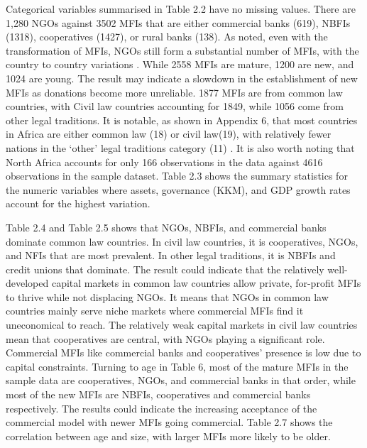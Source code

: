 \documentclass[a4paper, nobind]{templates/ociamthesis}
\begin{document}
Categorical variables summarised in Table 2.2 have no missing values. There are 1,280 NGOs against 3502 MFIs that are either commercial banks (619), NBFIs (1318), cooperatives (1427), or rural banks (138). As noted, even with the transformation of MFIs, NGOs still form a substantial number of MFIs, with the country to country variations \autocite{d2017ngos}. While 2558 MFIs are mature, 1200 are new, and 1024 are young. The result may indicate a slowdown in the establishment of new MFIs as donations become more unreliable. 1877 MFIs are from common law countries, with Civil law countries accounting for 1849, while 1056 come from other legal traditions. It is notable, as shown in Appendix 6, that most countries in Africa are either common law (18) or civil law(19), with relatively fewer nations in the `other' legal traditions category (11) \autocite{oto2014distribution}. It is also worth noting that North Africa accounts for only 166 observations in the data against 4616 observations in the sample dataset. Table 2.3 shows the summary statistics for the numeric variables where assets, governance (KKM), and GDP growth rates account for the highest variation.

Table 2.4 and Table 2.5 shows that NGOs, NBFIs, and commercial banks dominate common law countries. In civil law countries, it is cooperatives, NGOs, and NFIs that are most prevalent. In other legal traditions, it is NBFIs and credit unions that dominate. The result could indicate that the relatively well-developed capital markets in common law countries allow private, for-profit MFIs to thrive while not displacing NGOs. It means that NGOs in common law countries mainly serve niche markets where commercial MFIs find it uneconomical to reach. The relatively weak capital markets in civil law countries mean that cooperatives are central, with NGOs playing a significant role. Commercial MFIs like commercial banks and cooperatives' presence is low due to capital constraints. Turning to age in Table 6, most of the mature MFIs in the sample data are cooperatives, NGOs, and commercial banks in that order, while most of the new MFIs are NBFIs, cooperatives and commercial banks respectively. The results could indicate the increasing acceptance of the commercial model with newer MFIs going commercial. Table 2.7 shows the correlation between age and size, with larger MFIs more likely to be older.
\end{document}
